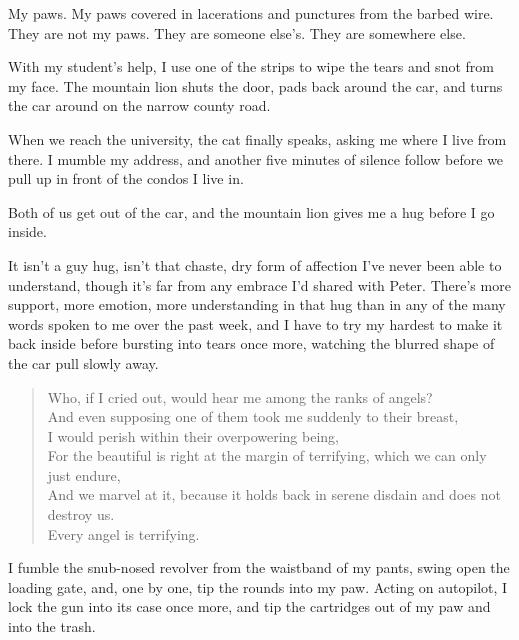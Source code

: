 My paws. My paws covered in lacerations and punctures from the barbed wire. They are not my paws. They are someone else's. They are somewhere else.

With my student's help, I use one of the strips to wipe the tears and snot from my face. The mountain lion shuts the door, pads back around the car, and turns the car around on the narrow county road.

When we reach the university, the cat finally speaks, asking me where I live from there. I mumble my address, and another five minutes of silence follow before we pull up in front of the condos I live in.

Both of us get out of the car, and the mountain lion gives me a hug before I go inside.

It isn't a guy hug, isn't that chaste, dry form of affection I've never been able to understand, though it's far from any embrace I'd shared with Peter. There's more support, more emotion, more understanding in that hug than in any of the many words spoken to me over the past week, and I have to try my hardest to make it back inside before bursting into tears once more, watching the blurred shape of the car pull slowly away.

\begin{verse}
Who, if I cried out, would hear me among the ranks of angels?\\
And even supposing one of them took me suddenly to their breast,\\
I would perish within their overpowering being,\\
For the beautiful is right at the margin of terrifying, which we can only just endure,\\
And we marvel at it, because it holds back in serene disdain and does not destroy us.\\
Every angel is terrifying.
\end{verse}

I fumble the snub-nosed revolver from the waistband of my pants, swing open the loading gate, and, one by one, tip the rounds into my paw. Acting on autopilot, I lock the gun into its case once more, and tip the cartridges out of my paw and into the trash.
